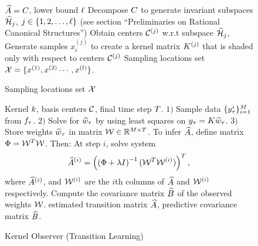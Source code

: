 \begin{figure}[t!]
	\begin{algorithm}[H]
		\caption{Sampling locations set $ \mathcal{X} $}
		\label{alg:samples}
		\begin{algorithmic}
				 $ \widehat{A} =C $, lower bound $\ell$
				\STATE Decompose $ C $ to generate invariant subspaces $ \widehat{\mathcal{H}}_{j} $, $ j\in \{1,2,\dots,\ell\} $ (see section ``Preliminaries on Rational Canonical Structures'')
				\STATE Obtain centers $\mathcal{C}^{(j)}$ w.r.t subspace $ \widehat{\mathcal{H}}_{j} $,
				\STATE Generate samples $x_i^{(j)}$ to create a kernel matrix $K^{(j)}$ that is shaded only with respect to centers $\mathcal{C}^{(j)}$
				\ENDFOR
				 Sampling locations set  $\mathcal{X} =\{x^{(1)}, x^{(2)}\cdots,x^{(l)}\} $.
		\end{algorithmic}
	\end{algorithm}
\end{figure}

\begin{figure}[t!]
	\centering
	\begin{algorithm}[H]
		\caption{Kernel Observer (Transition Learning)}
		\label{alg:egp_trans}
		\begin{algorithmic}
				 Kernel $k$, basis centers $\mathcal{C}$, final time 
				step $T$. 
				\WHILE{$\tindex \leq \ftime$}
				\STATE $1)$ Sample data $\{y^i_{\tau}\}_{i=1}^{M}$ from $f_{\tau}$. 
				\STATE $2)$ Solve for $\widehat{w}_\tau$ by using least squares on $y_{\tau} = K \widehat{w}_{\tau}$. 
				\STATE $3)$ Store weights $\widehat{w}_\tau$ in matrix $\mathcal{W}\in\mathbb{R}^{M\times T}$.
				\ENDWHILE
				\STATE To infer $\widehat{A}$, define matrix $\Phi = \mathcal{W}^T\mathcal{W}$. Then:
				\FOR{$i=1$ {\bfseries to} $\ncent$}
				\STATE At step $i$, solve system
				\begin{align}
				\widehat{A}^{(i)} = \left(\left(\Phi + \lambda I\right)^{-1}(\mathcal{W}^T\mathcal{W}^{(i)})\right)^T,
				\end{align}
				where $\widehat{A}^{(i)}$, and $\mathcal{W}^{(i)}$ are the $i$th columns of $\widehat{A}$ and $\mathcal{W}^{(i)}$ respectively. 
				\ENDFOR
				\STATE Compute the covariance matrix  $\widehat{B}$ of the observed 
				weights $\mathcal{W}$. 
				 estimated transition matrix $\widehat{A}$, predictive covariance    
				matrix $\widehat{B}$. 
		\end{algorithmic}
	\end{algorithm}
	\vspace{-0.3in}
\end{figure}

